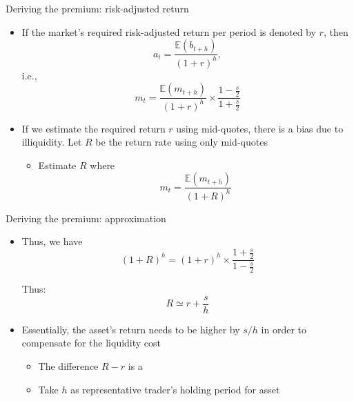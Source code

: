 \documentclass[english,10pt
,aspectratio=169
]{beamer}
\begin{document}
\begin{frame}{Deriving the premium: risk-adjusted return}
	\begin{itemize}
		\item If the market's required risk-adjusted return per period is denoted by $r$, then
		\begin{equation}\tag{9.3}
		a_t = \frac{\mathbb{E}(b_{t+h})}{(1+r)^h},
		\end{equation}
		i.e.,
		\begin{equation}\tag{9.4}
		m_t=\frac{\mathbb{E}(m_{t+h})}{(1+r)^h} \times \frac{1-\frac{s}{2}}{1+\frac{s}{2}}
		\end{equation}
		\item If we estimate the required return $r$ using mid-quotes, there is a bias due to illiquidity. Let $R$ be the return rate using only mid-quotes
		\begin{itemize}
			\item Estimate $R$ where
			\[
			m_t = \frac{\mathbb{E}(m_{t+h})}{(1+R)^h}
			\]
		\end{itemize}
	\end{itemize}
\end{frame}


\begin{frame}{Deriving the premium: approximation}
	\begin{itemize}
		\item Thus, we have
		\begin{equation}\tag{9.5}
		(1+R)^h = (1+r)^h \times \frac{1+\frac{s}{2}}{1-\frac{s}{2}}
		\end{equation}
		\begin{block}{}
			Thus:
			\[
			R \simeq r+\frac{s}{h}
			\]
		\end{block}
		\item Essentially, the asset's return needs to be higher by $s/h$ in order to compensate for the liquidity cost
		\begin{itemize}
			\item The difference $R-r$ is a 
			\item Take $h$ as representative trader's holding period for asset
		\end{itemize}
	\end{itemize}
\end{frame}
\end{document}
